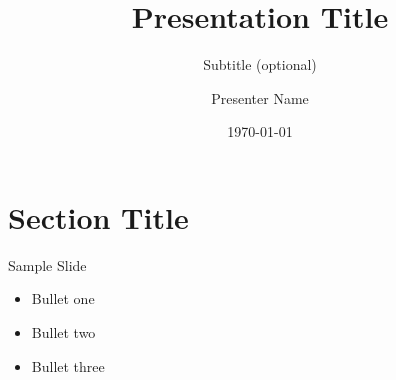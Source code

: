 \documentclass[10pt]{beamer}
\title{Presentation Title}
\subtitle{Subtitle (optional)}
\author{Presenter Name}
\date{\today}
\begin{document}
\maketitle

\section{Section Title}

\begin{frame}{Sample Slide}
  \begin{itemize}
    \item Bullet one
    \item Bullet two
    \item Bullet three
  \end{itemize}
\end{frame}
\end{document}
